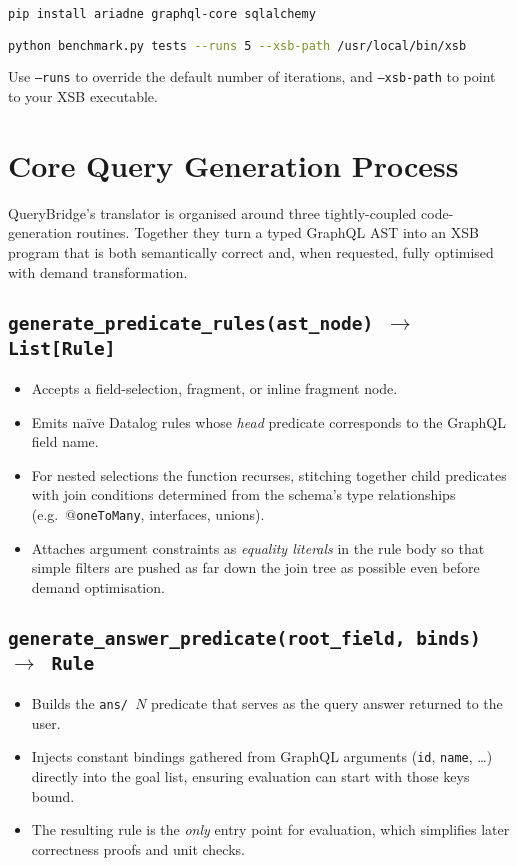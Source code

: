 \documentclass[11pt]{article}
\begin{document}
\begin{lstlisting}[language=bash]
pip install ariadne graphql-core sqlalchemy

python benchmark.py tests --runs 5 --xsb-path /usr/local/bin/xsb
\end{lstlisting}

Use \texttt{--runs} to override the default number of iterations, and \texttt{--xsb-path} to point to your XSB executable.


\section{Core Query Generation Process}
\label{sec:codegen}

QueryBridge’s translator is organised around three tightly-coupled
code-generation routines.  Together they turn a typed GraphQL AST into an
XSB program that is both semantically correct and, when requested, fully
optimised with demand transformation.

\subsection{\texttt{generate\_predicate\_rules(ast\_node) $\rightarrow$ List\texttt{[}Rule\texttt{]}}}
\begin{itemize}[leftmargin=1.5em]
  \item Accepts a field-selection, fragment, or inline fragment node.
  \item Emits naïve Datalog rules whose \emph{head} predicate corresponds
        to the GraphQL field name.  
  \item For nested selections the function recurses, stitching together
        child predicates with join conditions determined from the schema’s
        type relationships (e.g.\ @\texttt{oneToMany}, interfaces,
        unions).
  \item Attaches argument constraints as \emph{equality literals} in the
        rule body so that simple filters are pushed as far down the join
        tree as possible even before demand optimisation.
\end{itemize}

\subsection{\texttt{generate\_answer\_predicate(root\_field, binds) $\rightarrow$ Rule}}
\begin{itemize}[leftmargin=1.5em]
  \item Builds the \texttt{ans/\,$N$} predicate that serves as the query
        answer returned to the user.
  \item Injects constant bindings gathered from GraphQL arguments
        (\texttt{id}, \texttt{name}, \ldots) directly into the goal list,
        ensuring evaluation can start with those keys bound.
  \item The resulting rule is the \emph{only} entry point for evaluation,
        which simplifies later correctness proofs and unit checks.
\end{itemize}
\end{document}
